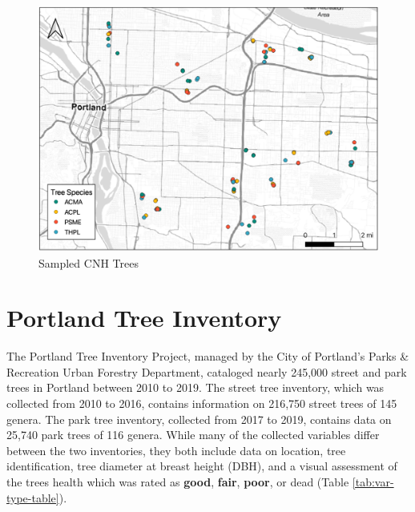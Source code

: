 \documentclass[12pt,twoside]{reedthesis}
\begin{document}
\begin{figure}

{\centering \includegraphics[width=1\linewidth]{figure/cnh_trees} 

}

\caption{Sampled CNH Trees}\label{fig:cnh-trees}
\end{figure}
\hypertarget{portland-tree-inventory}{%
\section{Portland Tree Inventory}\label{portland-tree-inventory}}

The Portland Tree Inventory Project, managed by the City of Portland's
Parks \& Recreation Urban Forestry Department, cataloged nearly 245,000
street and park trees in Portland between 2010 to 2019. The street tree
inventory, which was collected from 2010 to 2016, contains information
on 216,750 street trees of 145 genera. The park tree inventory,
collected from 2017 to 2019, contains data on 25,740 park trees of 116
genera. While many of the collected variables differ between the two
inventories, they both include data on location, tree identification,
tree diameter at breast height (DBH), and a visual assessment of the
trees health which was rated as \textbf{good}, \textbf{fair}, \textbf{poor}, or dead
(Table \ref{tab:var-type-table}).
\end{document}
